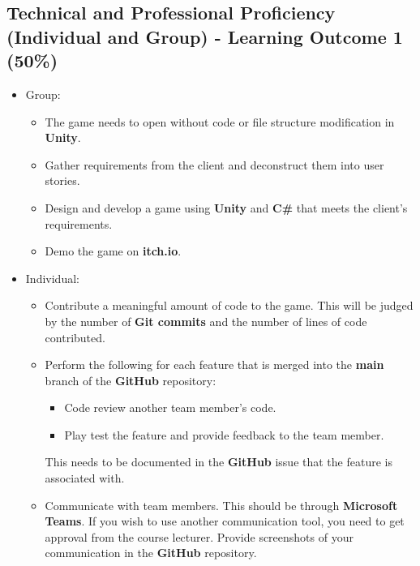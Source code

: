 \documentclass{article}
\begin{document}
\subsection*{Technical and Professional Proficiency (Individual and Group) - Learning Outcome 1 (50\%)}
\begin{itemize}
	\item Group:
	\begin{itemize}
		\item The game needs to open without code or file structure modification in \textbf{Unity}.
		\item Gather requirements from the client and deconstruct them into user stories.
		\item Design and develop a game using \textbf{Unity} and \textbf{C\#} that meets the client's requirements.
		\item Demo the game on \textbf{itch.io}.
	\end{itemize}
	\item Individual:
	\begin{itemize}
		\item Contribute a meaningful amount of code to the game. This will be judged by the number of \textbf{Git commits} and the number of lines of code contributed.
		\item Perform the following for each feature that is merged into the \textbf{main} branch of the \textbf{GitHub} repository:
		\begin{itemize}
			\item Code review another team member's code.
			\item Play test the feature and provide feedback to the team member.
		\end{itemize}
		This needs to be documented in the \textbf{GitHub} issue that the feature is associated with.
		\item Communicate with team members. This should be through \textbf{Microsoft Teams}. If you wish to use another communication tool, you need to get approval from the course lecturer. Provide screenshots of your communication in the \textbf{GitHub} repository.
	\end{itemize}
\end{itemize}
\end{document}
